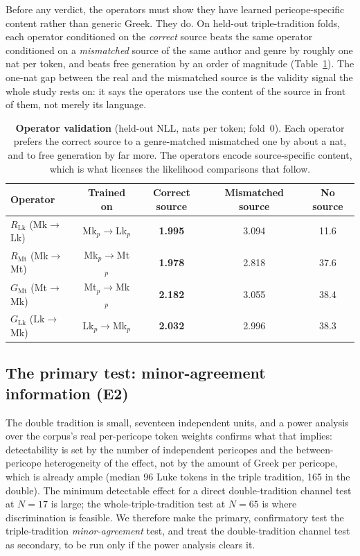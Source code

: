 \documentclass[11pt,letterpaper]{article}
\newcommand{\tblhead}{\rowcolor{marine!12}}
\begin{document}
Before any verdict, the operators must show they have learned pericope-specific content rather than generic Greek. They do. On held-out triple-tradition folds, each operator conditioned on the \emph{correct} source beats the same operator conditioned on a \emph{mismatched} source of the same author and genre by roughly one nat per token, and beats free generation by an order of magnitude (Table~\ref{tab:operators}). The one-nat gap between the real and the mismatched source is the validity signal the whole study rests on: it says the operators use the content of the source in front of them, not merely its language.

\begin{table}[H]
\centering\small
\begin{tabular}{lcccc}
\toprule
\tblhead\textbf{Operator} & \textbf{Trained on} & \textbf{Correct source} & \textbf{Mismatched source} & \textbf{No source} \\
\midrule
$R_{\mathrm{Lk}}$ (Mk$\to$Lk) & Mk$_p\to$Lk$_p$ & \textbf{1.995} & 3.094 & 11.6 \\
$R_{\mathrm{Mt}}$ (Mk$\to$Mt) & Mk$_p\to$Mt$_p$ & \textbf{1.978} & 2.818 & 37.6 \\
$G_{\mathrm{Mt}}$ (Mt$\to$Mk) & Mt$_p\to$Mk$_p$ & \textbf{2.182} & 3.055 & 38.4 \\
$G_{\mathrm{Lk}}$ (Lk$\to$Mk) & Lk$_p\to$Mk$_p$ & \textbf{2.032} & 2.996 & 38.3 \\
\bottomrule
\end{tabular}
\caption{\textbf{Operator validation} (held-out NLL, nats per token; fold~0). Each operator prefers the correct source to a genre-matched mismatched one by about a nat, and to free generation by far more. The operators encode source-specific content, which is what licenses the likelihood comparisons that follow.}
\label{tab:operators}
\end{table}

\subsection{The primary test: minor-agreement information (E2)}

The double tradition is small, seventeen independent units, and a power analysis over the corpus's real per-pericope token weights confirms what that implies: detectability is set by the number of independent pericopes and the between-pericope heterogeneity of the effect, not by the amount of Greek per pericope, which is already ample (median 96 Luke tokens in the triple tradition, 165 in the double). The minimum detectable effect for a direct double-tradition channel test at $N=17$ is large; the whole-triple-tradition test at $N=65$ is where discrimination is feasible. We therefore make the primary, confirmatory test the triple-tradition \emph{minor-agreement} test, and treat the double-tradition channel test as secondary, to be run only if the power analysis clears it.
\end{document}
